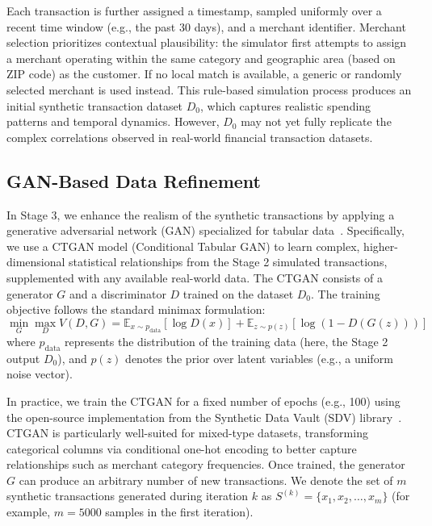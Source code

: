 \documentclass[conference]{IEEEtran}
\begin{document}
Each transaction is further assigned a timestamp, sampled uniformly over a recent time window (e.g., the past 30 days), and a merchant identifier. Merchant selection prioritizes contextual plausibility: the simulator first attempts to assign a merchant operating within the same category and geographic area (based on ZIP code) as the customer. If no local match is available, a generic or randomly selected merchant is used instead. This rule-based simulation process produces an initial synthetic transaction dataset \( D_0 \), which captures realistic spending patterns and temporal dynamics. However, \( D_0 \) may not yet fully replicate the complex correlations observed in real-world financial transaction datasets.



\subsection{GAN-Based Data Refinement} 
In Stage 3, we enhance the realism of the synthetic transactions by applying a generative adversarial network (GAN) specialized for tabular data~\cite{ctgan2019}. Specifically, we use a CTGAN model (Conditional Tabular GAN) to learn complex, higher-dimensional statistical relationships from the Stage 2 simulated transactions, supplemented with any available real-world data. The CTGAN consists of a generator \( G \) and a discriminator \( D \) trained on the dataset \( D_0 \). The training objective follows the standard minimax formulation:
\begin{equation}
\min_{G} \max_{D} V(D, G) = 
\mathbb{E}_{x \sim p_{\text{data}}}[\log D(x)] +
\mathbb{E}_{z \sim p(z)}[\log(1 - D(G(z)))]
\label{eq:gan-loss}
\end{equation}
where \( p_{\text{data}} \) represents the distribution of the training data (here, the Stage 2 output \( D_0 \)), and \( p(z) \) denotes the prior over latent variables (e.g., a uniform noise vector).

In practice, we train the CTGAN for a fixed number of epochs (e.g., 100) using the open-source implementation from the Synthetic Data Vault (SDV) library~\cite{ctgan2019}. CTGAN is particularly well-suited for mixed-type datasets, transforming categorical columns via conditional one-hot encoding to better capture relationships such as merchant category frequencies. Once trained, the generator \( G \) can produce an arbitrary number of new transactions. We denote the set of \( m \) synthetic transactions generated during iteration \( k \) as \( S^{(k)} = \{x_1, x_2, \ldots, x_m\} \) (for example, \( m=5000 \) samples in the first iteration).
\end{document}

